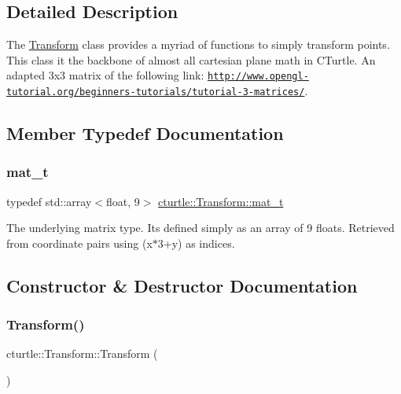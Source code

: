 \subsection{Detailed Description}
The \hyperlink{classcturtle_1_1Transform}{Transform} class provides a myriad of functions to simply transform points. This class it the backbone of almost all cartesian plane math in C\+Turtle. An adapted 3x3 matrix of the following link\+: \href{http://www.opengl-tutorial.org/beginners-tutorials/tutorial-3-matrices/}{\tt http\+://www.\+opengl-\/tutorial.\+org/beginners-\/tutorials/tutorial-\/3-\/matrices/}. 

\subsection{Member Typedef Documentation}
\mbox{\label{classcturtle_1_1Transform_a2952f427614626cb6b72553fb8451d8a}} 
\subsubsection{\texorpdfstring{mat\+\_\+t}{mat\_t}}
{\footnotesize\ttfamily typedef std\+::array$<$float, 9$>$ \hyperlink{classcturtle_1_1Transform_a2952f427614626cb6b72553fb8451d8a}{cturtle\+::\+Transform\+::mat\+\_\+t}\hspace{0.3cm}{\ttfamily [protected]}}

The underlying matrix type. It\textquotesingle{}s defined simply as an array of 9 floats. Retrieved from coordinate pairs using (x$\ast$3+y) as indices. 

\subsection{Constructor \& Destructor Documentation}
\mbox{\label{classcturtle_1_1Transform_a8b3953d07dfbe1f41ef5074144106d32}} 
\subsubsection{\texorpdfstring{Transform()}{Transform()}\hspace{0.1cm}{\footnotesize\ttfamily [1/2]}}
{\footnotesize\ttfamily cturtle\+::\+Transform\+::\+Transform (\begin{DoxyParamCaption}{ }\end{DoxyParamCaption})\hspace{0.3cm}{\ttfamily [inline]}}

